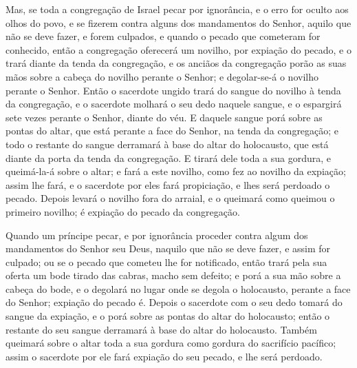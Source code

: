 Mas, se toda a congregação de Israel pecar por ignorância, e o
erro for oculto aos olhos do povo, e se fizerem contra alguns dos
mandamentos do Senhor, aquilo que não se deve fazer, e forem
culpados, e quando o pecado que cometeram for conhecido,
então a congregação oferecerá um novilho, por expiação do pecado, e
o trará diante da tenda da congregação, e os anciãos da
congregação porão as suas mãos sobre a cabeça do novilho perante o
Senhor; e degolar-se-á o novilho perante o Senhor. Então o
sacerdote ungido trará do sangue do novilho à tenda da congregação,
e o sacerdote molhará o seu dedo naquele sangue, e o
espargirá sete vezes perante o Senhor, diante do véu. E
daquele sangue porá sobre as pontas do altar, que está perante a
face do Senhor, na tenda da congregação; e todo o restante do sangue
derramará à base do altar do holocausto, que está diante da porta da
tenda da congregação. E tirará dele toda a sua gordura, e
queimá-la-á sobre o altar; e fará a este novilho, como fez ao
novilho da expiação; assim lhe fará, e o sacerdote por eles fará
propiciação, e lhes será perdoado o pecado. Depois levará o
novilho fora do arraial, e o queimará como queimou o primeiro
novilho; é expiação do pecado da congregação.

Quando um príncipe pecar, e por ignorância proceder contra algum
dos mandamentos do Senhor seu Deus, naquilo que não se deve fazer, e
assim for culpado; ou se o pecado que cometeu lhe for
notificado, então trará pela sua oferta um bode tirado das cabras,
macho sem defeito; e porá a sua mão sobre a cabeça do bode, e
o degolará no lugar onde se degola o holocausto, perante a face do
Senhor; expiação do pecado é. Depois o sacerdote com o seu
dedo tomará do sangue da expiação, e o porá sobre as pontas do altar
do holocausto; então o restante do seu sangue derramará à base do
altar do holocausto. Também queimará sobre o altar toda a sua
gordura como gordura do sacrifício pacífico; assim o sacerdote por
ele fará expiação do seu pecado, e lhe será perdoado.

